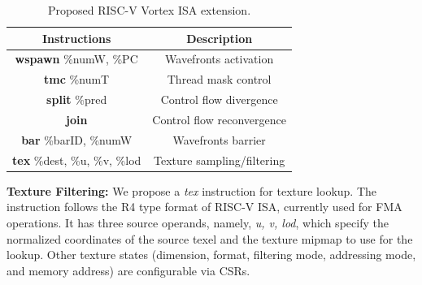 \documentclass{book}
\newcommand{\name}{Vortex } %
\begin{document}
\begin{table}[h]

\centering

\begin{tabular}{||c | c||}

 \hline

Instructions & Description \\

\hline\hline

\textbf{wspawn} \%numW, \%PC & Wavefronts activation  \\

 \textbf{tmc} \%numT & Thread mask control \\

\textbf{split} \%pred & Control flow divergence \\

\textbf{join} & Control flow reconvergence \\ [1ex]

 \textbf{bar} \%barID, \%numW & Wavefronts barrier \\

\textbf{tex} \%dest, \%u, \%v, \%lod & Texture sampling/filtering \\

\hline

\end{tabular}

\caption{Proposed RISC-V \name ISA extension.}

\label{table:isa}

\end{table}

\textbf{Texture Filtering:} We propose a \textit{tex} instruction for texture lookup. The instruction follows the R4 type format of RISC-V ISA, currently used for FMA operations. It has three source operands, namely, \textit{u, v, lod}, which specify the normalized coordinates of the source texel and the texture mipmap to use for the lookup. Other texture states (dimension, format, filtering mode, addressing mode, and memory address) are configurable via CSRs.
\end{document}
